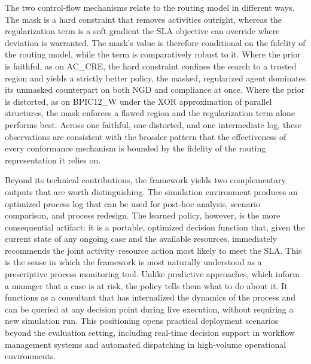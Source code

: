 \documentclass[journal,onecolumn]{IEEEtran}
\begin{document}
The two control-flow mechanisms relate to the routing model in
different ways. The mask is a hard constraint that removes activities
outright, whereas the regularization term is a soft gradient the SLA
objective can override where deviation is warranted. The mask's value
is therefore conditional on the fidelity of the routing model, while
the term is comparatively robust to it. Where the prior is faithful,
as on AC\_CRE, the hard constraint confines the search to a trusted
region and yields a strictly better policy, the masked, regularized
agent dominates its unmasked counterpart on both NGD and compliance at
once. Where the prior is distorted, as on BPIC12\_W under the XOR
approximation of parallel structures, the mask enforces a flawed region
and the regularization term alone performs best. Across one faithful,
one distorted, and one intermediate log, these observations are
consistent with the broader pattern that the effectiveness of every
conformance mechanism is bounded by the fidelity of the routing
representation it relies on.


Beyond its technical contributions, the framework yields two
complementary outputs that are worth distinguishing. The simulation
environment produces an optimized process log that can be used for
post-hoc analysis, scenario comparison, and process redesign. The
learned policy, however, is the more consequential artifact: it is
a portable, optimized decision function that, given the current state
of any ongoing case and the available resources, immediately
recommends the joint activity--resource action most likely to meet
the SLA. This is the sense in which the framework is most naturally
understood as a prescriptive process monitoring tool. Unlike
predictive approaches, which inform a manager that a case is at
risk, the policy tells them what to do about it. It functions as a
consultant that has internalized the dynamics of the process and can
be queried at any decision point during live execution, without
requiring a new simulation run. This positioning opens practical
deployment scenarios beyond the evaluation setting, including
real-time decision support in workflow management systems and
automated dispatching in high-volume operational environments.
\end{document}
